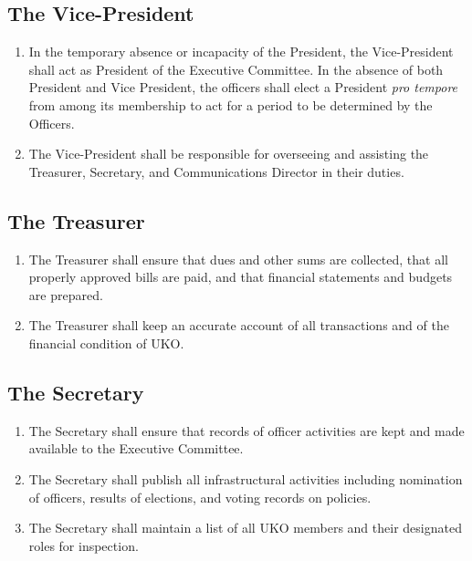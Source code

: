 \documentclass[12pt,executivepaper]{article}
\begin{document}
\subsection{The Vice-President}
\begin{enumerate}
    \item In the temporary absence or incapacity of the President, the Vice-President
          shall act as President of the Executive Committee. In the absence of both
          President and Vice President, the officers shall elect a President
          \textit{pro tempore} from among its membership to act for a period to be
          determined by the Officers.
    \item The Vice-President shall be responsible for overseeing and assisting
          the Treasurer, Secretary, and Communications Director in their
          duties.
\end{enumerate}

\subsection{The Treasurer}
\begin{enumerate}
    \item The Treasurer shall ensure that dues and other sums are collected, that all
          properly approved bills are paid, and that financial statements and budgets
          are prepared.
    \item The Treasurer shall keep an accurate account of all transactions and of the
          financial condition of UKO.
\end{enumerate}

\subsection{The Secretary}
\begin{enumerate}
    \item The Secretary shall ensure that records of officer activities are kept and made
          available to the Executive Committee.
    \item The Secretary shall publish all infrastructural activities including nomination
          of officers, results of elections, and voting records on policies.
    \item The Secretary shall maintain a list of all UKO members and their designated roles
          for inspection.
\end{enumerate}
\end{document}
